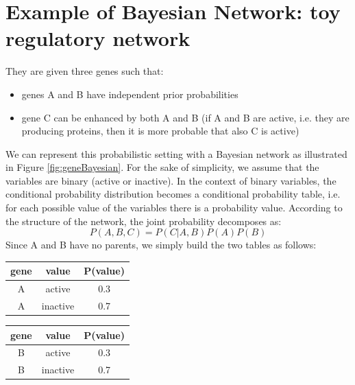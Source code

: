 
\section{Example of Bayesian Network: toy regulatory network}
They are given three genes such that:
\begin{itemize}
    \item genes A and B have independent prior probabilities
    \item gene C can be enhanced by both A and B (if A and B are active, i.e. they are producing proteins, then it is more probable that also C is active)
\end{itemize}
We can represent this probabilistic setting with a Bayesian network as illustrated in Figure \ref{fig:geneBayesian}.
For the sake of simplicity, we assume that the variables are binary (active or inactive). In the context of binary variables, the conditional probability distribution becomes a conditional probability table, i.e. for each possible value of the variables there is a probability value.
According to the structure of the network, the joint probability decomposes as:
$$P(A,B,C) = P(C | A,B) P(A) P(B)$$
Since A and B have no parents, we simply build the two tables as follows:
\begin{center}
\begin{tabular}{c|c|c} 
 \hline
 gene & value & P(value)\\ 
 \hline
 A & active & 0.3\\ 
 A & inactive & 0.7
\end{tabular}
\end{center}

\begin{center}
\begin{tabular}{c|c|c} 
 \hline
 gene & value & P(value)\\ 
 \hline
 B & active & 0.3\\ 
 B & inactive & 0.7
\end{tabular}
\end{center}

